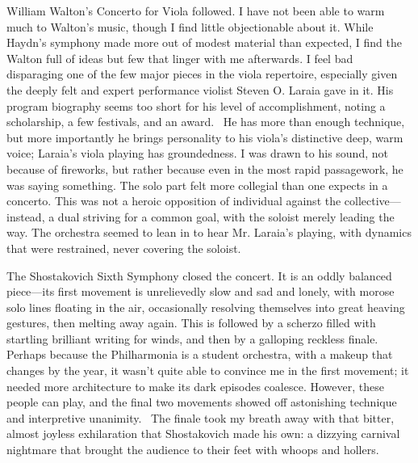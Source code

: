 William Walton’s Concerto for Viola followed. I have not been able to warm much to Walton’s music, though I find little objectionable about it. While Haydn’s symphony made more out of modest material than expected, I find the Walton full of ideas but few that linger with me afterwards. I feel bad disparaging one of the few major pieces in the viola repertoire, especially given the deeply felt and expert performance violist Steven O. Laraia gave in it. His program biography seems too short for his level of accomplishment, noting a scholarship, a few festivals, and an award.  He has more than enough technique, but more importantly he brings personality to his viola’s distinctive deep, warm voice; Laraia’s viola playing has groundedness. I was drawn to his sound, not because of fireworks, but rather because even in the most rapid passagework, he was saying something. The solo part felt more collegial than one expects in a concerto. This was not a heroic opposition of individual against the collective—instead, a dual striving for a common goal, with the soloist merely leading the way. The orchestra seemed to lean in to hear Mr. Laraia’s playing, with dynamics that were restrained, never covering the soloist.

The Shostakovich Sixth Symphony closed the concert. It is an oddly balanced piece—its first movement is unrelievedly slow and sad and lonely, with morose solo lines floating in the air, occasionally resolving themselves into great heaving gestures, then melting away again. This is followed by a scherzo filled with startling brilliant writing for winds, and then by a galloping reckless finale. Perhaps because the Philharmonia is a student orchestra, with a makeup that changes by the year, it wasn’t quite able to convince me in the first movement; it needed more architecture to make its dark episodes coalesce. However, these people can play, and the final two movements showed off astonishing technique and interpretive unanimity.  The finale took my breath away with that bitter, almost joyless exhilaration that Shostakovich made his own: a dizzying carnival nightmare that brought the audience to their feet with whoops and hollers.